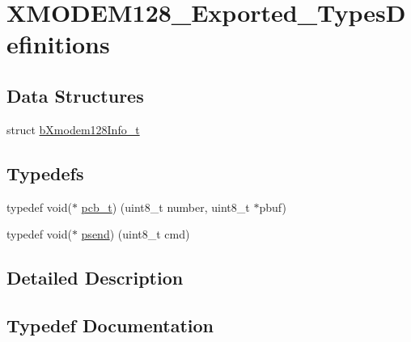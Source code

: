 \hypertarget{group___x_m_o_d_e_m128___exported___types_definitions}{}\section{X\+M\+O\+D\+E\+M128\+\_\+\+Exported\+\_\+\+Types\+Definitions}
\label{group___x_m_o_d_e_m128___exported___types_definitions}
\subsection*{Data Structures}
\begin{DoxyCompactItemize}
\item 
struct \mbox{\hyperlink{structb_xmodem128_info__t}{b\+Xmodem128\+Info\+\_\+t}}
\end{DoxyCompactItemize}
\subsection*{Typedefs}
\begin{DoxyCompactItemize}
\item 
typedef void($\ast$ \mbox{\hyperlink{group___x_m_o_d_e_m128___exported___types_definitions_ga1189ecafb71f5108788e9d2e7ac5e7f3}{pcb\+\_\+t}}) (uint8\+\_\+t number, uint8\+\_\+t $\ast$pbuf)
\item 
typedef void($\ast$ \mbox{\hyperlink{group___x_m_o_d_e_m128___exported___types_definitions_gad6ebbc53d3047463033cb2b686f40d66}{psend}}) (uint8\+\_\+t cmd)
\end{DoxyCompactItemize}


\subsection{Detailed Description}


\subsection{Typedef Documentation}
\mbox{\label{group___x_m_o_d_e_m128___exported___types_definitions_ga1189ecafb71f5108788e9d2e7ac5e7f3}} 
